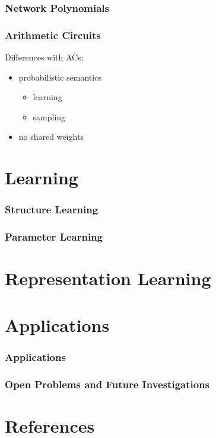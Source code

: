 \documentclass[xcolor={usenames,dvipsnames,svgnames}, compress]{beamer}
\begin{document}
\begin{frame}
\frametitle{Network Polynomials}
\end{frame}

\begin{frame}
  \frametitle{Arithmetic Circuits}
  Differences with ACs:
  \begin{itemize}
  \item probabilistic semantics
    \begin{itemize}
    \item learning
      \item sampling
    \end{itemize}
    \item no shared weights
  \end{itemize}
\end{frame}


\section{Learning}
{
  \begin{frame}
    \sectionpage
  \end{frame}
}

\begin{frame}
  \frametitle{Structure Learning}
\end{frame}

\begin{frame}
\frametitle{Parameter Learning}
\end{frame}

\section{Representation Learning}
{
  \begin{frame}
    \sectionpage
  \end{frame}
}
\section{Applications}
{
  \begin{frame}
    \sectionpage
  \end{frame}
}

\begin{frame}
\frametitle{Applications}
\end{frame}


\begin{frame}
\frametitle{Open Problems and Future Investigations}
\end{frame}

\section{References}
{
  \begin{frame}
    \sectionpage
  \end{frame}
}

\begin{frame} [allowframebreaks]
  \setlength\bibitemsep{8pt}
  \printbibliography
\end{frame}
\end{document}
